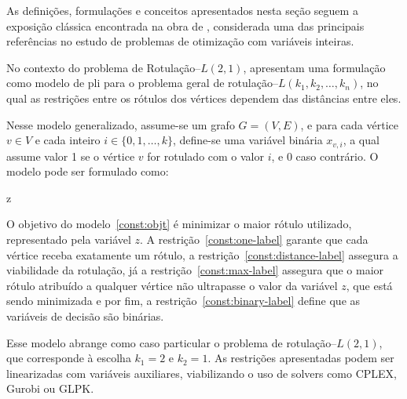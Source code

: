 As definições, formulações e conceitos apresentados nesta seção seguem a exposição clássica encontrada na obra de , considerada uma das principais referências no estudo de problemas de otimização com variáveis inteiras. 

No contexto do problema de Rotulação–$L(2,1)$,  apresentam uma formulação como modelo de \gls{pli} para o problema geral de rotulação–$L(k_1, k_2, \ldots, k_n)$, no qual as restrições entre os rótulos dos vértices dependem das distâncias entre eles. 

Nesse modelo generalizado, assume-se um grafo \(G = (V, E)\), e para cada vértice \(v \in V\) e cada inteiro \(i \in \{0, 1, \ldots, k\}\), define-se uma variável binária \(x_{v,i}\), a qual assume valor 1 se o vértice \(v\) for rotulado com o valor \(i\), e 0 caso contrário. O modelo pode ser formulado como:

\begin{mini!}
    {}{\quad z \label{const:objt}}{}{}
\end{mini!}

O objetivo do modelo~\eqref{const:objt} é minimizar o maior rótulo utilizado, representado pela variável \(z\). A restrição~\ref{const:one-label} garante que cada vértice receba exatamente um rótulo, a restrição~\ref{const:distance-label} assegura a viabilidade da rotulação, já a restrição~\ref{const:max-label} assegura que o maior rótulo atribuído a qualquer vértice não ultrapasse o valor da variável \(z\), que está sendo minimizada e por fim, a restrição~\ref{const:binary-label} define que as variáveis de decisão são binárias.

Esse modelo abrange como caso particular o problema de rotulação–$L(2,1)$, que corresponde à escolha \(k_1 = 2\) e \(k_2 = 1\). As restrições apresentadas podem ser linearizadas com variáveis auxiliares, viabilizando o uso de solvers como CPLEX, Gurobi ou GLPK.

